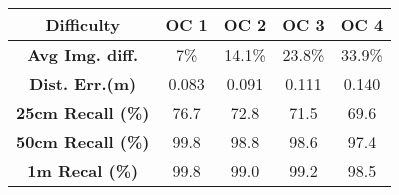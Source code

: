 \begin{tabular}{@{}ccccc@{}}

\toprule
\textbf{Difficulty} & \textbf{OC 1}                           & \textbf{OC 2}      & \textbf{OC 3}                            & \textbf{OC 4}     \\ \midrule                       %
\textbf{Avg Img. diff.}   & 7\%                               & 14.1\%                                                     & 23.8\%                             & 33.9\%                             \\  \midrule  
\textbf{Dist. Err.(m)}     & 0.083                             & 0.091                                                      & 0.111                              & 0.140                              \\
\textbf{25cm Recall (\%)}     & 76.7                              & 72.8                                                       & 71.5                               & 69.6                               \\
\textbf{50cm Recall (\%)}     & 99.8                              & 98.8                                                       & 98.6                               & 97.4                               \\
\textbf{1m Recal (\%)}       & 99.8                              & 99.0                                                         & 99.2                               & 98.5                               \\ \bottomrule

\end{tabular}